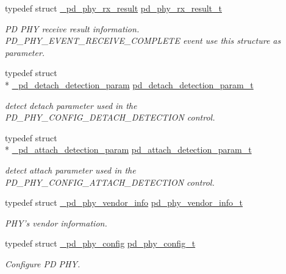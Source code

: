 \begin{DoxyCompactItemize}
typedef struct \hyperlink{struct__pd__phy__rx__result}{\-\_\-pd\-\_\-phy\-\_\-rx\-\_\-result} \hyperlink{group__usb__pd__phy__drv_gab6924dca8731119eec80f1740a1564eb}{pd\-\_\-phy\-\_\-rx\-\_\-result\-\_\-t}
\begin{DoxyCompactList}\small\item\em P\-D P\-H\-Y receive result information. P\-D\-\_\-\-P\-H\-Y\-\_\-\-E\-V\-E\-N\-T\-\_\-\-R\-E\-C\-E\-I\-V\-E\-\_\-\-C\-O\-M\-P\-L\-E\-T\-E event use this structure as parameter. \end{DoxyCompactList}\item 
typedef struct \\*
\hyperlink{struct__pd__detach__detection__param}{\-\_\-pd\-\_\-detach\-\_\-detection\-\_\-param} \hyperlink{group__usb__pd__phy__drv_ga658add3c5d8eb8ab53366b4850863a60}{pd\-\_\-detach\-\_\-detection\-\_\-param\-\_\-t}
\begin{DoxyCompactList}\small\item\em detect detach parameter used in the P\-D\-\_\-\-P\-H\-Y\-\_\-\-C\-O\-N\-F\-I\-G\-\_\-\-D\-E\-T\-A\-C\-H\-\_\-\-D\-E\-T\-E\-C\-T\-I\-O\-N control. \end{DoxyCompactList}\item 
typedef struct \\*
\hyperlink{struct__pd__attach__detection__param}{\-\_\-pd\-\_\-attach\-\_\-detection\-\_\-param} \hyperlink{group__usb__pd__phy__drv_gac52134faac462ac43b1a6fb59c6f693d}{pd\-\_\-attach\-\_\-detection\-\_\-param\-\_\-t}
\begin{DoxyCompactList}\small\item\em detect attach parameter used in the P\-D\-\_\-\-P\-H\-Y\-\_\-\-C\-O\-N\-F\-I\-G\-\_\-\-A\-T\-T\-A\-C\-H\-\_\-\-D\-E\-T\-E\-C\-T\-I\-O\-N control. \end{DoxyCompactList}\item 
typedef struct \hyperlink{struct__pd__phy__vendor__info}{\-\_\-pd\-\_\-phy\-\_\-vendor\-\_\-info} \hyperlink{group__usb__pd__phy__drv_ga4930ef145bdc6eb8fb43bb431eb305da}{pd\-\_\-phy\-\_\-vendor\-\_\-info\-\_\-t}
\begin{DoxyCompactList}\small\item\em P\-H\-Y's vendor information. \end{DoxyCompactList}\item 
typedef struct \hyperlink{struct__pd__phy__config}{\-\_\-pd\-\_\-phy\-\_\-config} \hyperlink{group__usb__pd__phy__drv_gab1d9a93a90c056727dcf364d6a5749e4}{pd\-\_\-phy\-\_\-config\-\_\-t}
\begin{DoxyCompactList}\small\item\em Configure P\-D P\-H\-Y. \end{DoxyCompactList}\item 

\end{DoxyCompactItemize}
